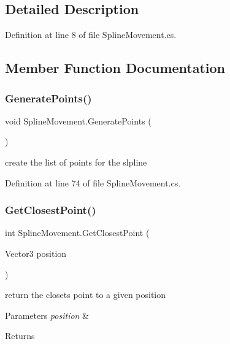 \subsection{Detailed Description}


Definition at line 8 of file Spline\+Movement.\+cs.



\subsection{Member Function Documentation}
\mbox{\label{class_spline_movement_a44f9470b8291c8fff0aa4eb23378623c}} 
\subsubsection{\texorpdfstring{Generate\+Points()}{GeneratePoints()}}
{\footnotesize\ttfamily void Spline\+Movement.\+Generate\+Points (\begin{DoxyParamCaption}{ }\end{DoxyParamCaption})}



create the list of points for the slpline 



Definition at line 74 of file Spline\+Movement.\+cs.

\mbox{\label{class_spline_movement_a687a1aedc6e6862ddc34cd3f2bd819ac}} 
\subsubsection{\texorpdfstring{Get\+Closest\+Point()}{GetClosestPoint()}}
{\footnotesize\ttfamily int Spline\+Movement.\+Get\+Closest\+Point (\begin{DoxyParamCaption}\item[{Vector3}]{position }\end{DoxyParamCaption})}



return the closets point to a given position 


\begin{DoxyParams}{Parameters}
{\em position} & \\
\hline
\end{DoxyParams}
\begin{DoxyReturn}{Returns}

\end{DoxyReturn}


